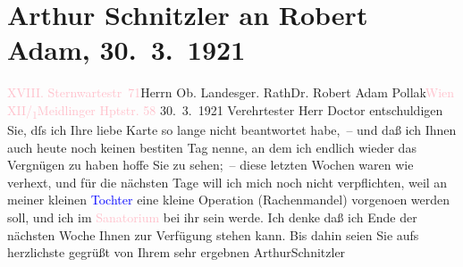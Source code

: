 

               \section[Arthur Schnitzler an Robert Adam, 30. 3. 1921]{ Arthur Schnitzler an Robert Adam, 30. 3. 1921}\nopagebreak{}\rehead{ }\normalsize\beginnumbering{} \toendnotes[C]{\smallbreak\pagebreak[2]} 
\toendnotes[C]{\smallbreak}\pstart{}{\pb}\textcolor{pink}{XVIII. Sternwartestr 71}{}\ledrightnote{\textcolor{pink}{Sternwartestraße}}\pend{}{\bigskip}\pstart{}Herrn Ob. Landesger. Rath\pend{}\pstart{}Dr. Robert Adam Pollak\pend{}\pstart{}\textcolor{pink}{Wien XII/\textsubscript{1}}{}\ledrightnote{\textcolor{pink}{XII., Meidling}}\pend{}\pstart{}\textcolor{pink}{Meidlinger Hptstr. 58}{}\ledrightnote{\textcolor{pink}{Meidlinger Hauptstraße}}\pend{}{\bigskip}\pstart
           \raggedleft{}{\pb}30. 3. 1921\pend
           \pstart{}Verehrtester Herr Doctor\pend\pstart
           entschuldigen Sie, dſs ich Ihre liebe Karte so lange nicht beantwortet habe, –
                    und daß ich Ihnen auch heute noch keinen besti{\geminationm}ten
                    Tag nenne, an dem ich endlich wieder das Vergnügen zu haben hoffe Sie zu
                    sehen; – diese letzten Wochen waren wie verhext, und für die nächsten Tage will
                    ich mich noch nicht verpflichten, weil an meiner kleinen \textcolor{blue}{Tochter}{} eine kleine Operation
                    (Rachenmandel) vorgeno{\geminationm}en werden soll, und ich im
                        \textcolor{pink}{Sanatorium}{} bei ihr sein
                    {\pb}werde. Ich denke daß ich Ende der \introOben{}nächsten\introOben{} Woche Ihnen zur Verfügung stehen kann. Bis dahin seien Sie
                    aufs herzlichste gegrüßt von Ihrem sehr ergebnen\pend
           \pstart \spacefill\mbox{ArthurSchnitzler}\pend{}\endnumbering{}  
      